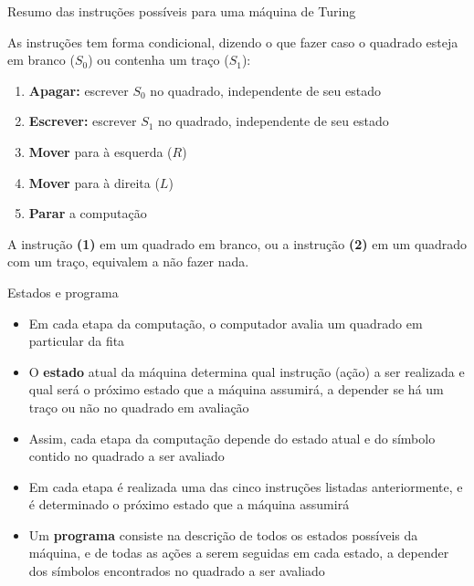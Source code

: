 \begin{frame}[fragile]{Resumo das instruções possíveis para uma máquina de Turing}

    As instruções tem forma condicional, dizendo o que fazer caso o quadrado esteja em branco
    ($S_0$) ou contenha um traço ($S_1$):

    \vspace{0.1in}

    \begin{enumerate}[(1)]
        \item \textbf{Apagar:} escrever $S_0$ no quadrado, independente de seu estado
        \item \textbf{Escrever:} escrever $S_1$ no quadrado, independente de seu estado
        \item \textbf{Mover} para à esquerda ($R$)
        \item \textbf{Mover} para à direita ($L$)
        \item \textbf{Parar} a computação
    \end{enumerate}

    \vspace{0.1in}
    A instrução \textbf{(1)} em um quadrado em branco, ou a instrução \textbf{(2)} em um quadrado
    com um traço, equivalem a não fazer nada.
\end{frame}

\begin{frame}[fragile]{Estados e programa}

    \begin{itemize}
        \item Em cada etapa da computação, o computador avalia um quadrado em particular da fita

        \item O \textbf{estado} atual da máquina determina qual instrução (ação) a ser realizada
            e qual será o próximo estado que a 
            máquina assumirá, a depender se há um traço ou não no quadrado em avaliação

        \item Assim, cada etapa da computação depende do estado atual e do símbolo contido no 
            quadrado a ser avaliado

        \item Em cada etapa é realizada uma das cinco instruções listadas anteriormente, e é 
            determinado o próximo estado que a máquina assumirá

        \item Um \textbf{programa} consiste na descrição de todos os estados possíveis da máquina,
            e de todas as ações a serem seguidas em cada estado, a depender dos símbolos 
            encontrados no quadrado a ser avaliado
    \end{itemize}

\end{frame}

